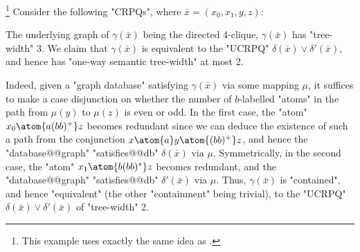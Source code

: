 \begin{example}
    \AP\label{ex:CRPQ-tw3-stw2}
	\!\footnote{This example uses exactly the same idea as
	.}
    Consider the following "CRPQs",
    where $\bar x = (x_0,x_1,y,z)$:\leavevmode
    \begin{center}
        \small

    \end{center}
    \noindent
    The underlying graph of $\gamma(\bar x)$ being the directed 4-clique, $\gamma 
    (\bar x)$ has "tree-width" 3. We claim that $\gamma(\bar x)$ is equivalent to the "UCRPQ"
    $\delta(\bar x) \lor \delta'(\bar x)$, and hence has "one-way semantic tree-width" at most 2.

    Indeed, given a "graph database" satisfying $\gamma(\bar x)$ via some mapping $\mu$, 
    it suffices to make a case disjunction on whether the number of $b$-labelled "atoms"
    in the path from
    $\mu(y)$ to $\mu(z)$ is even or odd. In the first case, the "atom" $x_0\atom{a(bb)^+} z$ becomes
    redundant since we can deduce the existence of such a path from the conjunction
    $x \atom{a} y \atom{(bb)^+} z$, and hence the "database@@graph" "satisfies@@db" $\delta(\bar x)$ via $\mu$.
    Symmetrically, in the second case, the "atom" $x_1 \atom{b(bb)^*} z$ becomes redundant,
    and the "database@@graph" "satisfies@@db" $\delta'(\bar x)$ via $\mu$. 
    Thus, $\gamma(\bar x)$
    is "contained", and hence "equivalent" (the other "containment" being trivial), to
    the "UCRPQ" $\delta(\bar x) \lor \delta'(\bar x)$ of "tree-width" 2.
\end{example}

